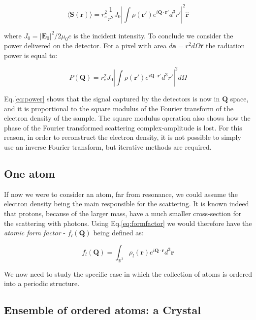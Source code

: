 \begin{equation}
    \langle \mathbf{S(r)} \rangle = r_e^2 \frac{1}{r^2}J_0
    \left| \int \rho(\mathbf{r'}) e^{i \mathbf{Q}\cdot \mathbf{r'}} d^3 r' \right|^2 \mathbf{\hat{r}}
    \label{eq:poynting}
\end{equation}

where $J_0 = \left| \mathbf{E}_0 \right|^2 / 2\mu_0c$ is the incident intensity. 
To conclude we consider the power delivered on the detector. For a pixel with area $d\mathbf a = r^2d\Omega\mathbf{\hat{r}}$ 
the radiation power is equal to: 

\begin{equation}
    P(\mathbf{Q})= r_e^2 J_0
    \left| \int \rho(\mathbf{r'}) e^{i \mathbf{Q}\cdot \mathbf{r'}} d^3 r' \right|^2 d\Omega
    \label{eq:power}
\end{equation}

Eq.\ref{eq:power} shows that the signal captured by the detectors is now in $\mathbf{Q}$ space, and it is proportional 
to the square modulus of the Fourier transform of the electron density of the sample. The square modulus operation also 
shows how the phase of the Fourier transformed scattering complex-amplitude is lost. For this reason, in order to reconstruct 
the electron density, it is not possible to simply use an inverse Fourier transform, but iterative methods are required. 

\subsection{One atom}

If now we were to consider an atom, far from resonance, we could assume the electron density being the main responsible 
for the scattering. It is known indeed that protons, because of the larger mass, have a much smaller cross-section for the
scattering with photons. 
Using Eq.\ref{eq:formfactor} we would therefore have the \textit{atomic form factor} - $f_l(\mathbf{Q})$ being defined as: 

\begin{equation}
    f_l(\mathbf{Q}) = 
   \int_{\mathbb{R}^3} \rho_l(\mathbf r) e^{i \mathbf{Q} \cdot \mathbf{r}}  d^3 \mathbf r
   \label{eq:atomformfactor}
\end{equation} 

We now need to study the specific case in which the collection of atoms is ordered into a periodic structure. 

\subsection{Ensemble of ordered atoms: a Crystal}

